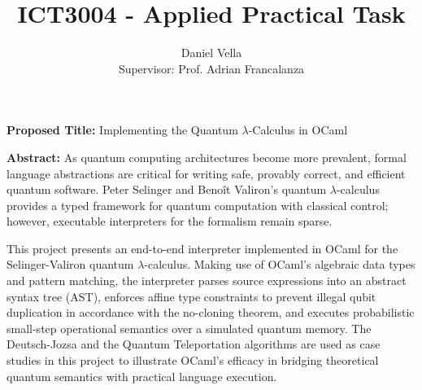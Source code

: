 \documentclass[11pt, a4paper]{article}
\title{\Huge \textbf{ICT3004 - Applied Practical Task}}
\author{%
  \Large Daniel Vella \\[0.3em]
  \large Supervisor: Prof. Adrian Francalanza
}
\date{} %
\begin{document}
\maketitle

\textbf{Proposed Title:} Implementing the Quantum $\lambda$-Calculus in OCaml

\medskip

\textbf{Abstract:} As quantum computing architectures become more prevalent, formal language abstractions are critical for writing safe, provably correct, and efficient quantum software. Peter Selinger and Benoît Valiron's quantum $\lambda$-calculus provides a typed framework for quantum computation with classical control; however, executable interpreters for the formalism remain sparse. 

This project presents an end-to-end interpreter implemented in OCaml for the Selinger-Valiron quantum $\lambda$-calculus. Making use of OCaml's algebraic data types and pattern matching, the interpreter parses source expressions into an abstract syntax tree (AST), enforces affine type constraints to prevent illegal qubit duplication in accordance with the no-cloning theorem, and executes probabilistic small-step operational semantics over a simulated quantum memory. The Deutsch-Jozsa and the Quantum Teleportation algorithms are used as case studies in this project to illustrate OCaml's efficacy in bridging theoretical quantum semantics with practical language execution.
\end{document}
